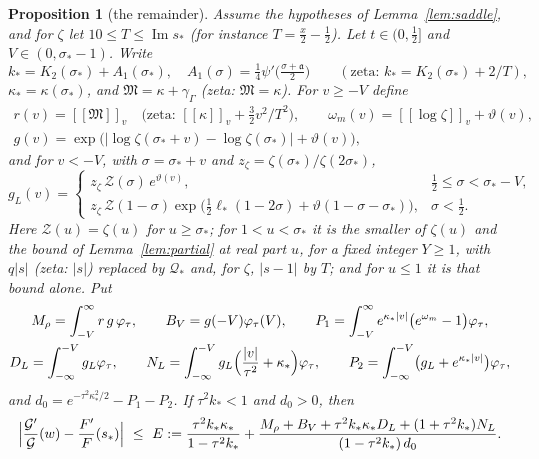 \documentclass[11pt]{article}
\newtheorem{proposition}[theorem]{Proposition}
\theoremstyle{definition}
\theoremstyle{remark}
\newcommand{\cG}{\mathcal G}
\newcommand{\fa}{\mathfrak a}
\newcommand{\Rem}[1]{[\![#1]\!]}
\newcommand{\im}{\operatorname{Im}}
\numberwithin{equation}{section}
\begin{document}
\begin{proposition}[the remainder]\label{prop:E}
Assume the hypotheses of Lemma~\ref{lem:saddle}, and for $\zeta$ let
$10\le T\le\im s_*$ (for instance $T=\frac x2-\frac12$). Let
$t\in(0,\frac12]$ and $V\in(0,\sigma_*-1)$. Write
\[
k_*=K_2(\sigma_*)+A_1(\sigma_*),\quad A_1(\sigma)=\tfrac14\psi'\bigl(\tfrac{\sigma+\fa}2\bigr)\qquad(\text{zeta: }k_*=K_2(\sigma_*)+2/T),
\]
$\kappa_*=\kappa(\sigma_*)$, and $\mathfrak M=\kappa+\gamma_\Gamma$ (zeta:
$\mathfrak M=\kappa$). For $v\ge-V$ define
\begin{gather*}
r(v)=\Rem{\mathfrak M}_v\quad\bigl(\text{zeta: }\Rem{\kappa}_v+\tfrac32v^2/T^2\bigr),\qquad
\omega_m(v)=\Rem{\log\zeta}_v+\vartheta(v),\\
g(v)=\exp\bigl(\lvert\log\zeta(\sigma_*+v)-\log\zeta(\sigma_*)\rvert+\vartheta(v)\bigr),
\end{gather*}
and for $v<-V$, with $\sigma=\sigma_*+v$ and
$z_\zeta=\zeta(\sigma_*)/\zeta(2\sigma_*)$,
\[
g_L(v)=\begin{cases}z_\zeta\,\mathcal Z(\sigma)\,e^{\vartheta(v)},&\frac12\le\sigma<\sigma_*-V,\\
z_\zeta\,\mathcal Z(1-\sigma)\exp\bigl(\frac12\ell_*(1-2\sigma)+\vartheta(1-\sigma-\sigma_*)\bigr),&\sigma<\frac12.\end{cases}
\]
Here $\mathcal Z(u)=\zeta(u)$ for $u\ge\sigma_*$; for $1<u<\sigma_*$ it is
the smaller of $\zeta(u)$ and the bound of Lemma~\ref{lem:partial} at real
part $u$, for a fixed integer $Y\ge1$, with $q\lvert s\rvert$ (zeta:
$\lvert s\rvert$) replaced by $\mathcal Q_*$ and, for $\zeta$,
$\lvert s-1\rvert$ by $T$; and for $u\le1$ it is that bound alone. Put
\begin{gather*}
M_\rho=\int_{-V}^\infty r\,g\,\varphi_\tau,\qquad B_V=g(-V)\varphi_\tau(V),\qquad
P_1=\int_{-V}^\infty e^{\kappa_*\lvert v\rvert}\bigl(e^{\omega_m}-1\bigr)\varphi_\tau,\\
D_L=\int_{-\infty}^{-V}g_L\varphi_\tau,\qquad
N_L=\int_{-\infty}^{-V}g_L\Bigl(\frac{\lvert v\rvert}{\tau^2}+\kappa_*\Bigr)\varphi_\tau,\qquad
P_2=\int_{-\infty}^{-V}\bigl(g_L+e^{\kappa_*\lvert v\rvert}\bigr)\varphi_\tau,
\end{gather*}
and $d_0=e^{-\tau^2\kappa_*^2/2}-P_1-P_2$. If $\tau^2k_*<1$ and $d_0>0$,
then
\begin{equation}\label{eq:E}
\Bigl\lvert\frac{\cG'}{\cG}(w)-\frac{F'}{F}(s_*)\Bigr\rvert\ \le\ E:=
\frac{\tau^2k_*\kappa_*}{1-\tau^2k_*}+\frac{M_\rho+B_V+\tau^2k_*\kappa_*D_L+(1+\tau^2k_*)N_L}{(1-\tau^2k_*)\,d_0}.
\end{equation}
\end{proposition}
\end{document}
